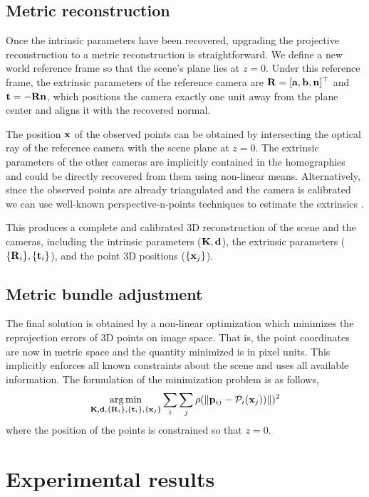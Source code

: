 \documentclass[10pt,twocolumn,letterpaper]{article}
\begin{document}
\subsection{Metric reconstruction}

Once the intrinsic parameters have been recovered, upgrading the projective reconstruction to a metric reconstruction is straightforward. We define a new world reference frame so that the scene's plane lies at $z=0$. Under this reference frame, the extrinsic parameters of the reference camera are $\mathbf{R}=[\mathbf{a}, \mathbf{b}, \mathbf{n}]^\top$ and $\mathbf{t}= - \mathbf{R} \mathbf{n}$, which positions the camera exactly one unit away from the plane center and aligns it with the recovered normal.

The position $\mathbf{x}$ of the observed points can be obtained by intersecting the optical ray of the reference camera with the scene plane at $z=0$. The extrinsic parameters of the other cameras are implicitly contained in the homographies and could be directly recovered from them using non-linear means. Alternatively, since the observed points are already triangulated and the camera is calibrated we can use well-known perspective-n-points techniques to estimate the extrinsics \cite{quan1999}.

This produces a complete and calibrated 3D reconstruction of the scene and the cameras, including the intrinsic parameters ($\mathbf{K},\mathbf{d}$), the extrinsic parameters ($\lbrace \mathbf{R}_i \rbrace,\lbrace \mathbf{t}_i \rbrace$), and the point 3D positions ($\lbrace \mathbf{x}_j \rbrace$).

\subsection{Metric bundle adjustment}

The final solution is obtained by a non-linear optimization which minimizes the reprojection errors of 3D points on image space. That is, the point coordinates are now in metric space and the quantity minimized is in pixel units. This implicitly enforces all known constraints about the scene and uses all available information. The formulation of the minimization problem is as follows, 
%
\begin{align}
\argmin_{\Km,\dv,\lbrace \Rm_i \rbrace,\lbrace \tv_i \rbrace, \lbrace \xv_j \rbrace} 
%
\sum_i \sum_j \rho(\norm{\pv_{ij} - \Projection_i(\xv_j))})^2 
\end{align}
%
where the position of the points is constrained so that $z=0$. 

\section{Experimental results}
\label{sec:results}
\end{document}
